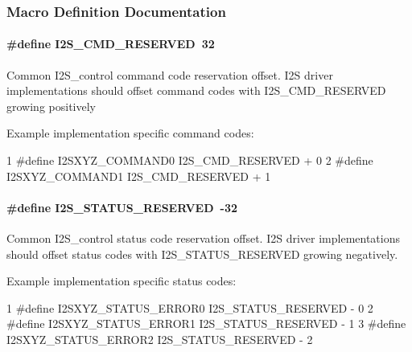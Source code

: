 \subsubsection{Macro Definition Documentation}
\paragraph[{I2\+S\+\_\+\+C\+M\+D\+\_\+\+R\+E\+S\+E\+R\+V\+E\+D}]{\setlength{\rightskip}{0pt plus 5cm}\#define I2\+S\+\_\+\+C\+M\+D\+\_\+\+R\+E\+S\+E\+R\+V\+E\+D~32}\label{_i2_s_8h_af919ac4341fca59988c28e16058fa819}
Common I2\+S\+\_\+control command code reservation offset. I2\+S driver implementations should offset command codes with I2\+S\+\_\+\+C\+M\+D\+\_\+\+R\+E\+S\+E\+R\+V\+E\+D growing positively

Example implementation specific command codes\+: 
\begin{DoxyCode}
1 #define I2SXYZ\_COMMAND0         I2S\_CMD\_RESERVED + 0
2 #define I2SXYZ\_COMMAND1         I2S\_CMD\_RESERVED + 1
\end{DoxyCode}
\paragraph[{I2\+S\+\_\+\+S\+T\+A\+T\+U\+S\+\_\+\+R\+E\+S\+E\+R\+V\+E\+D}]{\setlength{\rightskip}{0pt plus 5cm}\#define I2\+S\+\_\+\+S\+T\+A\+T\+U\+S\+\_\+\+R\+E\+S\+E\+R\+V\+E\+D~-\/32}\label{_i2_s_8h_a3fad4fcf6773f3c5946c4881631f838d}
Common I2\+S\+\_\+control status code reservation offset. I2\+S driver implementations should offset status codes with I2\+S\+\_\+\+S\+T\+A\+T\+U\+S\+\_\+\+R\+E\+S\+E\+R\+V\+E\+D growing negatively.

Example implementation specific status codes\+: 
\begin{DoxyCode}
1 #define I2SXYZ\_STATUS\_ERROR0    I2S\_STATUS\_RESERVED - 0
2 #define I2SXYZ\_STATUS\_ERROR1    I2S\_STATUS\_RESERVED - 1
3 #define I2SXYZ\_STATUS\_ERROR2    I2S\_STATUS\_RESERVED - 2
\end{DoxyCode}
